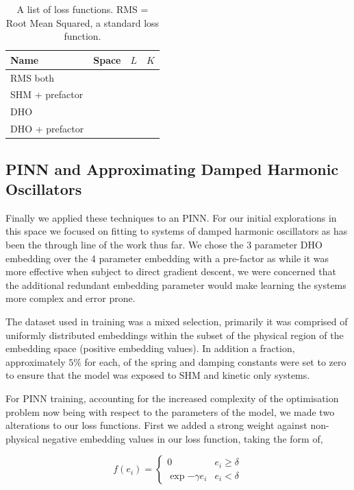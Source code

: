 \begin{table}
\label{table:optimisation-results}
\caption{A list of loss functions. RMS = Root Mean Squared, a standard loss function.}
\begin{tabular}{l|c|c|c}
  Name & Space & $L$ & $K$ \\
  \hline
  RMS both \\
  SHM + prefactor  \\
  DHO \\
  DHO + prefactor \\
\end{tabular}
\end{table}


\subsection{PINN and Approximating Damped Harmonic Oscillators}

Finally we applied these techniques to an PINN. For our initial explorations in this space we focused on fitting to systems of damped harmonic oscillators as has been the through line of the work thus far. We chose the 3 parameter DHO embedding over the 4 parameter embedding with a pre-factor as while it was more effective when subject to direct gradient descent, we were concerned that the additional redundant embedding parameter would make learning the systems more complex and error prone. 

The dataset used in training was a mixed selection, primarily it was comprised of uniformly distributed embeddings within the subset of the physical region of the embedding space (positive embedding values). In addition a fraction, approximately $5 \%$ for each, of the spring and damping constants were set to zero to ensure that the model was exposed to SHM and kinetic only systems.

For PINN training, accounting for the increased complexity of the optimisation problem now being with respect to the parameters of the model, we made two alterations to our loss functions. First we added a strong weight against non-physical negative embedding values in our loss function, taking the form of,

\begin{equation}
  f(e_i) = \begin{cases}
  	0 & e_i \ge \delta \\
  	\exp{-\gamma e_i} & e_i < \delta 
  \end{cases}
\end{equation}

